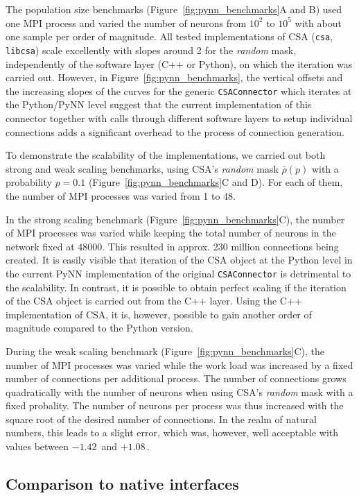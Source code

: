 \documentclass{frontiersSCNS} %
\newcommand{\permil}{\,\textperthousand\xspace}
\newcommand{\Figure}[2]{Figure~\ref{#2}}
\newcommand{\Figure}[2]{Figure~#1}
\begin{document}
The population size benchmarks (\Figure{4}{fig:pynn_benchmarks}A and
B) used one MPI process and varied the number of neurons from $10^2$
to $10^5$ with about one sample per order of magnitude. All tested
implementations of CSA (\verb|csa|, \verb|libcsa|) scale excellently
with slopes around 2 for the \emph{random} mask, independently of the
software layer (C++ or Python), on which the iteration was carried
out. However, in \Figure{4}{fig:pynn_benchmarks}, the vertical offsets
and the increasing slopes of the curves for the generic
\verb|CSAConnector| which iterates at the Python/PyNN level suggest
that the current implementation of this connector together with calls
through different software layers to setup individual connections adds
a significant overhead to the process of connection generation.

To demonstrate the scalability of the implementations, we carried out
both strong and weak scaling benchmarks, using CSA's \emph{random}
mask $\bar{\rho}(p)$ with a probability $p = 0.1$ (\Figure{4}{fig:pynn_benchmarks}C
and D). For each of them, the number of MPI processes was varied from
1 to 48.

In the strong scaling benchmark (\Figure{4}{fig:pynn_benchmarks}C),
the number of MPI processes was varied while keeping the total number
of neurons in the network fixed at $48000$. This resulted in
approx. 230 million connections being created. It is easily visible
that iteration of the CSA object at the Python level in the current
PyNN implementation of the original \verb|CSAConnector| is detrimental
to the scalability. In contrast, it is possible to obtain perfect
scaling if the iteration of the CSA object is carried out from the C++
layer. Using the C++ implementation of CSA, it is, however, possible
to gain another order of magnitude compared to the Python version.

During the weak scaling benchmark (\Figure{4}{fig:pynn_benchmarks}C),
the number of MPI processes was varied while the work load was
increased by a fixed number of connections per additional process.
The number of connections grows quadratically with the number of
neurons when using CSA's \emph{random} mask with a fixed
probality. The number of neurons per process was thus increased with
the square root of the desired number of connections. In the realm of
natural numbers, this leads to a slight error, which was, however,
well acceptable with values between $-1.42$\permil and $+1.08$\permil.

\subsection{Comparison to native interfaces}
\end{document}

